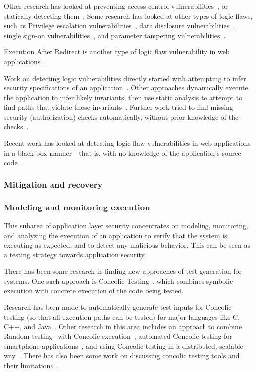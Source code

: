 \documentclass[11pt,letterpaper]{article}
\begin{document}
Other research has looked at preventing access control
vulnerabilities~\cite{dalton09:nemesis}, or statically detecting
them~\cite{Sun2011}.
Some research has looked at other types of logic
flaws, such as
Privilege escalation vulnerabilities~\cite{Monshizadeh2014}, data disclosure
vulnerabilities~\cite{Muthukumaran2015}, single sign-on vulnerabilities~\cite{Zhou2014}, and parameter tampering vulnerabilities~\cite{Bisht2010, Bisht2011}.

Execution After Redirect is another type of logic flaw
vulnerability in web applications~\cite{Doupe2011, Payet2013}.

Work on detecting logic vulnerabilities directly started with
attempting to infer security specifications of an
application~\cite{tan08:autoises, Livshits2009a}. Other approaches dynamically
execute the application to infer likely invariants, then use static
analysis to attempt to find paths that violate those
invariants~\cite{felmetsger10:logic}. Further work tried to find missing
security (authorization) checks automatically, without prior knowledge
of the checks~\cite{Son2011, Son2013}.

Recent work has looked at detecting logic flaw vulnerabilities in web
applications in a black-box manner---that is, with no knowledge of the
application's source code~\cite{Pellegrino2014}.



\subsubsection{Mitigation and recovery}

\subsubsection{Modeling and monitoring execution}
This subarea of application layer security concentrates on modeling, monitoring, and analyzing the execution of an application to verify that the system is executing as expected, and to detect any malicious behavior. This can be seen as a testing strategy towards application security.

There has been some research in finding new approaches of test generation for systems. One such approach is Concolic Testing~\cite{sen2007concolic}, which combines symbolic execution with concrete execution of the code being tested.

Research has been made to automatically generate test inputs for Concolic testing (so that all execution paths can be tested) for major languages like C, C++, and Java~\cite{Garg2013, Jayaraman2009, Sen2005}. Other research in this area includes an approach to combine Random testing~\cite{bird1983automatic} with Concolic execution~\cite{Majumdar2007}, automated Concolic testing for smartphone applications~\cite{anand2012automated}, and using Concolic testing in a distributed, scalable way~\cite{kim2012scalable}. There has also been some work on discussing concolic testing tools and their limitations~\cite{Qu2011}.
\end{document}

